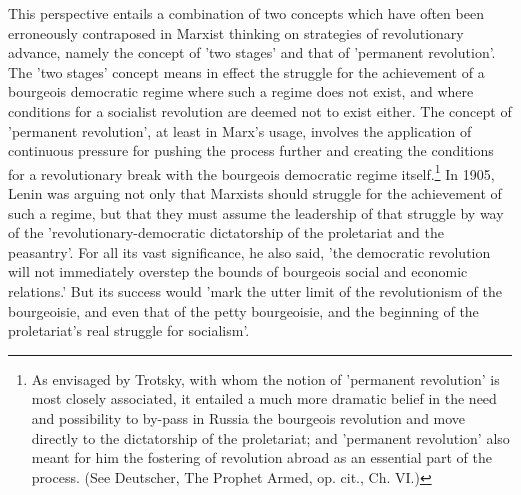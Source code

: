 This perspective entails a combination of two concepts which have often been erroneously contraposed in Marxist thinking on strategies of revolutionary advance, namely the concept of 'two stages' and that of 'permanent revolution'. The 'two stages' concept means in effect the struggle for the achievement of a bourgeois democratic regime where such a regime does not exist, and where conditions for a socialist revolution are deemed not to exist either. The concept of 'permanent revolution', at least in Marx's usage, involves the application of continuous pressure for pushing the process further and creating the conditions for a revolutionary break with the bourgeois democratic regime itself.\footnote{As envisaged by Trotsky, with whom the notion of 'permanent revolution' is most closely associated, it entailed a much more dramatic belief in the need and possibility to by-pass in Russia the bourgeois revolution and move directly to the dictatorship of the proletariat; and 'permanent revolution' also meant for him the fostering of revolution abroad as an essential part of the process. (See Deutscher, The Prophet Armed, op. cit., Ch. VI.)} In 1905, Lenin was arguing not only that Marxists should struggle for the achievement of such a regime, but that they must assume the leadership of that struggle by way of the 'revolutionary-democratic dictatorship of the proletariat and the peasantry'. For all its vast significance, he also said, 'the democratic revolution will not immediately overstep the bounds of bourgeois social and economic relations.' But its success would 'mark the utter limit of the revolutionism of the bourgeoisie, and even that of the petty bourgeoisie, and the beginning of the proletariat's real struggle for socialism'.

